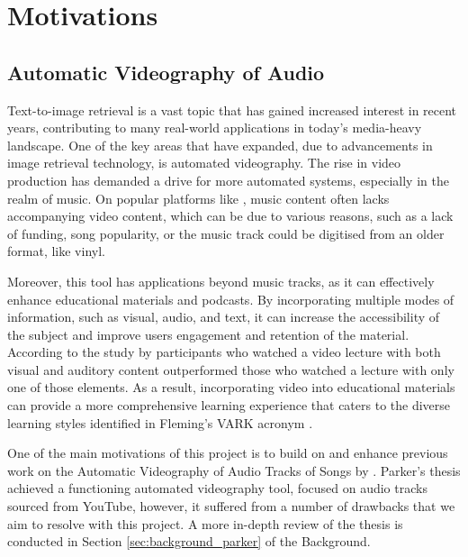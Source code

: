 \documentclass{l4proj}
\begin{document}
\section{Motivations}
\subsection{Automatic Videography of Audio}
Text-to-image retrieval is a vast topic that has gained increased interest in recent years, contributing to many real-world applications in today's media-heavy landscape. One of the key areas that have expanded, due to  advancements in image retrieval technology, is automated videography. The rise in video production \citep{tprisevideo} has demanded a drive for more automated systems, especially in the realm of music. On popular platforms like \cite{youtube}, music content often lacks accompanying video content, which can be due to various reasons, such as a lack of funding, song popularity, or the music track could be digitised from an older format, like vinyl. 

Moreover, this tool has applications beyond music tracks, as it can effectively enhance educational materials and podcasts. By incorporating multiple modes of information, such as visual, audio, and text, it can increase the accessibility of the subject and improve users engagement and retention of the material. According to the study by \citep{benefits_of_mmv} participants who watched a video lecture with both visual and auditory content outperformed those who watched a lecture with only one of those elements. As a result, incorporating video into educational materials can provide a more comprehensive learning experience that caters to the diverse learning styles identified in Fleming's VARK acronym \citep{vark}.

One of the main motivations of this project is to build on and enhance previous work on the Automatic Videography of Audio Tracks of Songs by \cite{parker}. Parker's thesis achieved a functioning automated videography tool, focused on audio tracks sourced from YouTube, however, it suffered from a number of drawbacks that we aim to resolve with this project. A more in-depth review of the thesis is conducted in Section \ref{sec:background_parker} of the Background.
\end{document}
